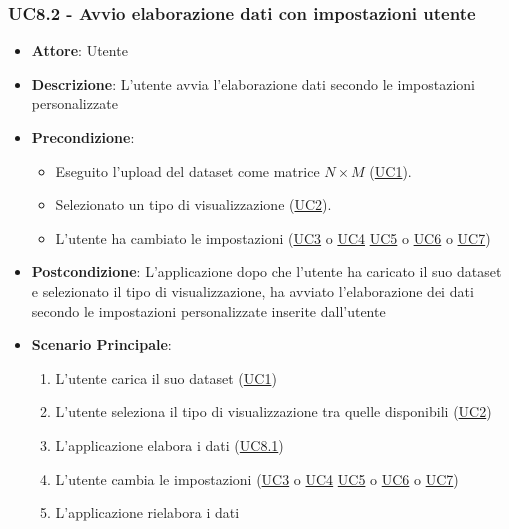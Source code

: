     \subsubsection{UC8.2 - Avvio elaborazione dati con impostazioni utente}
    \label{uc8.2}
    \begin{itemize}
    \item \textbf{Attore}: Utente
    \item \textbf{Descrizione}:  L'utente avvia l'elaborazione dati secondo le impostazioni personalizzate
    \item \textbf{Precondizione}: 
    \begin{itemize}
        \item Eseguito l'upload del dataset come matrice $N\times M$ (\hyperref[uc1]{UC1}).
        \item Selezionato un tipo di visualizzazione (\hyperref[uc2]{UC2}).
        \item L'utente ha cambiato le impostazioni (\hyperref[uc3]{UC3} o \hyperref[uc4]{UC4} \hyperref[uc5]{UC5} o \hyperref[uc6]{UC6} o \hyperref[uc7]{UC7})
    \end{itemize}  
    \item \textbf{Postcondizione}: L'applicazione dopo che l'utente ha caricato il suo dataset e selezionato il tipo di visualizzazione, ha avviato l'elaborazione dei dati secondo le impostazioni personalizzate inserite dall'utente
    \item \textbf{Scenario Principale}: 
    \begin{enumerate}
        \item L'utente carica il suo dataset (\hyperref[uc1]{UC1})
        \item L'utente seleziona il tipo di visualizzazione tra quelle disponibili (\hyperref[uc2]{UC2})
        \item L'applicazione elabora i dati (\hyperref[uc8.1]{UC8.1})
        \item L'utente cambia le impostazioni (\hyperref[uc3]{UC3} o \hyperref[uc4]{UC4} \hyperref[uc5]{UC5} o \hyperref[uc6]{UC6} o \hyperref[uc7]{UC7})
        \item L'applicazione rielabora i dati
    \end{enumerate}
    \end{itemize}